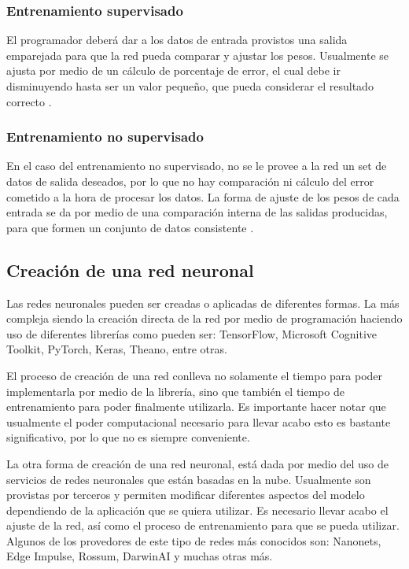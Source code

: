 \subsubsection{Entrenamiento supervisado}
El programador deberá dar a los datos de entrada provistos una salida emparejada para que la red pueda comparar y ajustar los pesos. Usualmente se ajusta por medio de un cálculo de porcentaje de error, el cual debe ir disminuyendo hasta ser un valor pequeño, que pueda considerar el resultado correcto \cite{olabe_2008}.
\subsubsection{Entrenamiento no supervisado}
En el caso del entrenamiento no supervisado, no se le provee a la red un set de datos de salida deseados, por lo que no hay comparación ni cálculo del error cometido a la hora de procesar los datos. La forma de ajuste de los pesos de cada entrada se da por medio de una comparación interna de las salidas producidas, para que formen un conjunto de datos consistente \cite{olabe_2008}. 
\subsection{Creación de una red neuronal}
Las redes neuronales pueden ser creadas o aplicadas de diferentes formas. La más compleja siendo la creación directa de la red por medio de programación haciendo uso de diferentes librerías como pueden ser: TensorFlow, Microsoft Cognitive Toolkit, PyTorch, Keras, Theano, entre otras. 
\par
El proceso de creación de una red conlleva no solamente el tiempo para poder implementarla por medio de la librería, sino que también el tiempo de entrenamiento para poder finalmente utilizarla. Es importante hacer notar que usualmente el poder computacional necesario para llevar acabo esto es bastante significativo, por lo que no es siempre conveniente.
\par
La otra forma de creación de una red neuronal, está dada por medio del uso de servicios de redes neuronales que están basadas en la nube. Usualmente son provistas por terceros y permiten modificar diferentes aspectos del modelo dependiendo de la aplicación que se quiera utilizar. Es necesario llevar acabo el ajuste de la red, así como el proceso de entrenamiento para que se pueda utilizar. Algunos de los provedores de este tipo de redes más conocidos son: Nanonets, Edge Impulse, Rossum, DarwinAI y muchas otras más.


